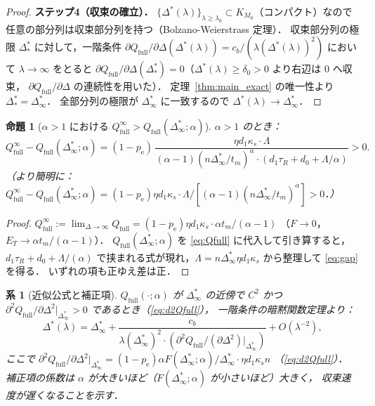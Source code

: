 \documentclass[12pt,a4paper]{article}
\theoremstyle{plain}
\newtheorem{proposition}[theorem]{命題}
\newtheorem{corollary}[theorem]{系}
\theoremstyle{definition}
\theoremstyle{remark}
\newcommand{\pe}{p_{\mathrm{e}}}
\newcommand{\Qf}{Q_{\mathrm{full}}}
\newcommand{\Dopt}{\Delta^{*}}
\newcommand{\Dinf}{\Delta^{*}_{\infty}}
\begin{document}
\begin{proof}
\textbf{ステップ4（収束の確立）．}
$\{\Dopt(\lambda)\}_{\lambda\ge\lambda_0}\subset K_{M_0}$（コンパクト）なので
任意の部分列は収束部分列を持つ（Bolzano-Weierstrass 定理）．
収束部分列の極限 $\Dopt_*$ に対して，一階条件
$\partial\Qf/\partial\Delta(\Dopt(\lambda))=c_b/(\lambda(\Dopt(\lambda))^2)$
において $\lambda\to\infty$ をとると
$\partial\Qf/\partial\Delta(\Dopt_*)=0$（$\Dopt(\lambda)\ge\delta_0>0$ より右辺は 0 へ収束，
$\partial\Qf/\partial\Delta$ の連続性を用いた）．
定理~\ref{thm:main_exact} の唯一性より $\Dopt_*=\Dinf$．
全部分列の極限が $\Dinf$ に一致するので $\Dopt(\lambda)\to\Dinf$．
\end{proof}

\begin{proposition}[$\alpha>1$ における $\Qf^\infty>\Qf(\Dinf;\alpha)$]\label{prop:gap}
$\alpha>1$ のとき：
\begin{equation}\label{eq:gap}
\Qf^\infty-\Qf(\Dinf;\alpha)
=(1-\pe)\,\frac{\eta d_1\kappa_s\cdot\Lambda}{(\alpha-1)(n\Dinf/t_m)^\alpha\cdot(d_1\tau_R+d_0+\Lambda/\alpha)}>0.
\end{equation}
（より簡明に：$\Qf^\infty-\Qf(\Dinf;\alpha)=(1-\pe)\eta d_1\kappa_s\cdot\Lambda/[(\alpha-1)(n\Dinf/t_m)^\alpha]>0$．）
\end{proposition}

\begin{proof}
$\Qf^\infty:=\lim_{\Delta\to\infty}\Qf=(1-\pe)\eta d_1\kappa_s\cdot\alpha t_m/(\alpha-1)$
（$F\to0$，$E_T\to\alpha t_m/(\alpha-1)$）．
$\Qf(\Dinf;\alpha)$ を \eqref{eq:Qfull} に代入して引き算すると，
$d_1\tau_R+d_0+\Lambda/(\alpha)$ で挟まれる式が現れ，$\Lambda=n\Dinf\eta d_1\kappa_s$ から整理して \eqref{eq:gap} を得る．
いずれの項も正ゆえ差は正．
\end{proof}

\begin{corollary}[近似公式と補正項]\label{cor:taylor}
$\Qf(\cdot;\alpha)$ が $\Dinf$ の近傍で $C^2$ かつ $\partial^2\Qf/\partial\Delta^2|_{\Dinf}>0$ であるとき（\eqref{eq:d2Qfull}），
一階条件の暗黙関数定理より：
\begin{equation}\label{eq:taylor_approx}
\Dopt(\lambda)=\Dinf+\frac{c_b}{\lambda(\Dinf)^2\cdot(\partial^2\Qf/(\partial\Delta^2)|_{\Dinf})}+O(\lambda^{-2}),
\end{equation}
ここで $\partial^2\Qf/\partial\Delta^2|_{\Dinf}=(1-\pe)\alpha F(\Dinf;\alpha)/\Dinf\cdot\eta d_1\kappa_s n$
（\eqref{eq:d2Qfull}）．
補正項の係数は $\alpha$ が大きいほど（$F(\Dinf;\alpha)$ が小さいほど）大きく，
収束速度が遅くなることを示す．
\end{corollary}
\end{document}
